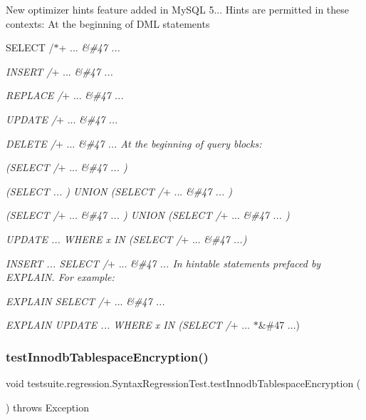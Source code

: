 New optimizer hints feature added in My\+S\+QL 5... Hints are permitted in these contexts\+: At the beginning of D\+ML statements
\begin{DoxyItemize}
\item S\+E\+L\+E\+CT /$\ast$+ ... {\itshape \&\#47 ...}
\item {\itshape I\+N\+S\+E\+RT /}+ ... {\itshape \&\#47 ...}
\item {\itshape R\+E\+P\+L\+A\+CE /}+ ... {\itshape \&\#47 ...}
\item {\itshape U\+P\+D\+A\+TE /}+ ... {\itshape \&\#47 ...}
\item {\itshape D\+E\+L\+E\+TE /}+ ... {\itshape \&\#47 ... At the beginning of query blocks\+:}
\item {\itshape (S\+E\+L\+E\+CT /}+ ... {\itshape \&\#47 ... )}
\item {\itshape (S\+E\+L\+E\+CT ... ) U\+N\+I\+ON (S\+E\+L\+E\+CT /}+ ... {\itshape \&\#47 ... )}
\item {\itshape (S\+E\+L\+E\+CT /}+ ... {\itshape \&\#47 ... ) U\+N\+I\+ON (S\+E\+L\+E\+CT /}+ ... {\itshape \&\#47 ... )}
\item {\itshape U\+P\+D\+A\+TE ... W\+H\+E\+RE x IN (S\+E\+L\+E\+CT /}+ ... {\itshape \&\#47 ...)}
\item {\itshape I\+N\+S\+E\+RT ... S\+E\+L\+E\+CT /}+ ... {\itshape \&\#47 ... In hintable statements prefaced by E\+X\+P\+L\+A\+IN. For example\+:}
\item {\itshape E\+X\+P\+L\+A\+IN S\+E\+L\+E\+CT /}+ ... {\itshape \&\#47 ...}
\item {\itshape E\+X\+P\+L\+A\+IN U\+P\+D\+A\+TE ... W\+H\+E\+RE x IN (S\+E\+L\+E\+CT /}+ ... $\ast$\&\#47 ...) 
\end{DoxyItemize}\mbox{\label{classtestsuite_1_1regression_1_1_syntax_regression_test_a1f0cfdcb063613f04cf8941bdf34de94}} 
\subsubsection{\texorpdfstring{test\+Innodb\+Tablespace\+Encryption()}{testInnodbTablespaceEncryption()}}
{\footnotesize\ttfamily void testsuite.\+regression.\+Syntax\+Regression\+Test.\+test\+Innodb\+Tablespace\+Encryption (\begin{DoxyParamCaption}{ }\end{DoxyParamCaption}) throws Exception}

